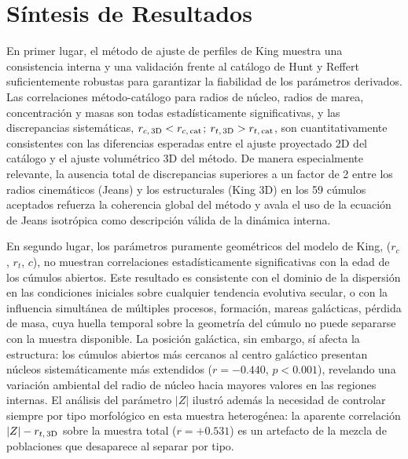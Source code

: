     \section{Síntesis de Resultados}

        En primer lugar, el método de ajuste de perfiles de King muestra una 
        consistencia interna y una validación frente al catálogo de Hunt y 
        Reffert suficientemente robustas para garantizar la fiabilidad de los 
        parámetros derivados. Las correlaciones método-catálogo para radios de 
        núcleo, radios de marea, concentración y masas son todas 
        estadísticamente significativas, y las discrepancias sistemáticas, 
        $r_{c,\, 3{\rm D}} < r_{c,\, {\rm cat}}$; $r_{t,\, 3{\rm D}} > 
        r_{t,\, {\rm cat}}$, son cuantitativamente consistentes con las 
        diferencias esperadas entre el ajuste proyectado 2D del catálogo y el 
        ajuste volumétrico 3D del método. De manera especialmente relevante, la 
        ausencia total de discrepancias superiores a un factor de 2 entre los 
        radios cinemáticos (Jeans) y los estructurales (King 3D) en los 59 
        cúmulos aceptados refuerza la coherencia global del método y avala el 
        uso de la ecuación de Jeans isotrópica como descripción válida de la 
        dinámica interna.

        En segundo lugar, los parámetros puramente geométricos del modelo de 
        King, ($r_c$, $r_t$, $c$), no muestran correlaciones estadísticamente 
        significativas con la edad de los cúmulos abiertos. Este resultado es 
        consistente con el dominio de la dispersión en las condiciones iniciales 
        sobre cualquier tendencia evolutiva secular, o con la influencia 
        simultánea de múltiples procesos, formación, mareas galácticas, pérdida 
        de masa, cuya huella temporal sobre la geometría del cúmulo no puede 
        separarse con la muestra disponible. La posición galáctica, sin embargo, 
        sí afecta la estructura: los cúmulos abiertos más cercanos al centro 
        galáctico presentan núcleos sistemáticamente más extendidos 
        ($r = -0.440$, $p < 0.001$), revelando una variación ambiental del radio 
        de núcleo hacia mayores valores en las regiones internas. El análisis 
        del parámetro $|Z|$ ilustró además la necesidad de controlar siempre por 
        tipo morfológico en esta muestra heterogénea: la aparente correlación 
        $|Z|-r_{t,\, 3{\rm D}}$ sobre la muestra total ($r = +0.531$) es un 
        artefacto de la mezcla de poblaciones que desaparece al separar por 
        tipo.


